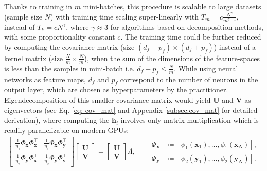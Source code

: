 \documentclass[preview,border=0.3pt]{standalone}
\begin{document}
Thanks to training in  $m$ mini-batches, this procedure is scalable to large datasets (sample size $N$) with training time scaling super-linearly with $ T_m = c \frac{N^{\gamma}}{m^{\gamma -1}}$, instead of $ T_k = c N^{\gamma} $, where $\gamma \approx 3$ for algorithms based on decomposition methods, with some proportionality constant $c$. The training time could be further reduced by computing the covariance matrix (size $(d_{f}+p_{f}) \times (d_{f}+p_{f})$) instead of a kernel matrix (size $\frac{N}{m} \times \frac{N}{m}$), when the sum of the dimensions of the feature-spaces is less than the samples in mini-batch i.e. $d_{f}+p_{f}\leq \frac{N}{m}$. While using neural networks as feature maps, $d_{f}$ and $p_{f}$ correspond to the number of neurons in the output layer, which are chosen as hyperparameters by the practitioner. Eigendecomposition of this smaller covariance matrix would yield $\bm{U}$ and $\bm{V}$ as eigenvectors (see Eq. \ref{eq: cov_mat} and Appendix \ref{subsec:cov_mat} for detailed derivation), where computing the $\bm{h}_i$ involves only matrix-multiplication which is readily parallelizable on modern GPUs:
%
\begin{equation}\label{eq: cov_mat}
    \begin{aligned}
        \begin{bmatrix}
            \frac{1}{\eta_1} \Phi_{\bm{x}}\Phi_{\bm{x}}^{\top} & \frac{1}{\eta_1}\Phi_{\bm{x}}\Phi_{\bm{y}}^{\top} \\
            \frac{1}{\eta_2}\Phi_{\bm{y}}\Phi_{\bm{x}}^{\top}  & \frac{1}{\eta_2}\Phi_{\bm{y}}\Phi_{\bm{y}}^{\top}
        \end{bmatrix}
        \begin{bmatrix}
            \bm{U} \\ \bm{V}
        \end{bmatrix} =
        \begin{bmatrix}
            \bm{U} \\ \bm{V}
        \end{bmatrix}\Lambda, & \quad \begin{aligned}
            \Phi_{\bm{x}} & \coloneqq\left[ \phi_{1}(\bm{x}_{1}),\dots, \phi_{1}(\bm{x}_{N}) \right], \\
            \Phi_{\bm{y}} & \coloneqq\left[ \phi_{2}(\bm{y}_{1}),\dots, \phi_{2}(\bm{y}_{N}) \right].
        \end{aligned}
    \end{aligned}
\end{equation}
%
%
\end{document}
